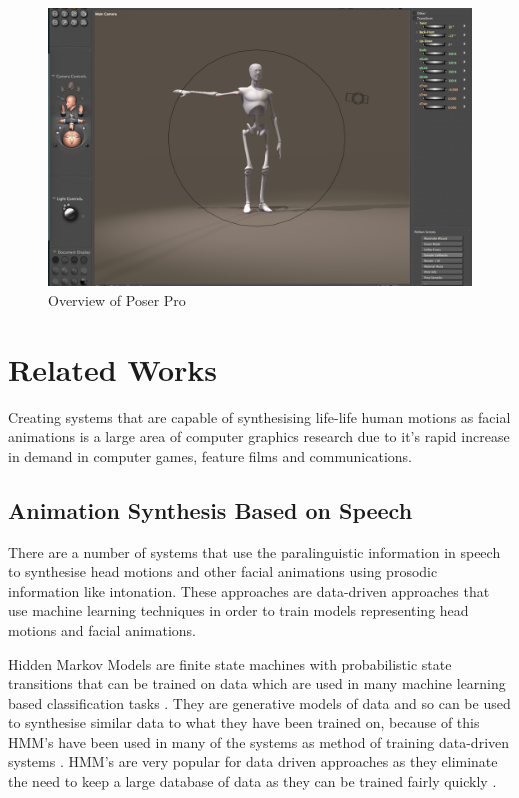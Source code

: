 \documentclass[bsc,frontabs,twoside,singlespacing,parskip,deptreport]{infthesis}
\begin{document}
\begin{figure}
	\centering
		\includegraphics[width=1.0\textwidth]{poser.png}
		\caption{Overview of Poser Pro}
\end{figure}

\section{Related Works}

Creating systems that are capable of synthesising life-life human motions as facial animations is a large area of computer graphics research due to it's rapid increase in demand in computer games, feature films and communications.

\subsection{Animation Synthesis Based on Speech}

There are a number of systems that use the paralinguistic information in speech to synthesise head motions and other facial animations using prosodic information like intonation. These approaches are data-driven approaches that use machine learning techniques in order to train models representing head motions and facial animations.

Hidden Markov Models are finite state machines with probabilistic state transitions that can be trained on data which are used in many machine learning based classification tasks \cite{hmms}. They are generative models of data and so can be used to synthesise similar data to what they have been trained on, because of this HMM's have been used in many of the systems as method of training data-driven systems \cite{puppetry}.  HMM's are very popular for data driven approaches as they eliminate the need to keep a large database of data as they can be trained fairly quickly \cite{expressive_speech_animation}. 
\end{document}
